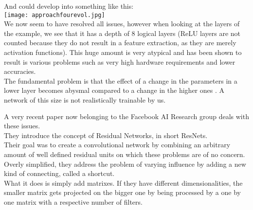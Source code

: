 And could develop into something like this:\\
\texttt{[image: approachfourevol.jpg]}\\

We now seem to have resolved all issues, however when looking at the layers of the example, we see that it has a depth of 8 logical layers (ReLU layers are not counted because they do not result in a feature extraction, as they are merely activation functions). This huge amount is very atypical and has been shown to result is various problems such as very high hardware requirements and lower accuracies\cite{Simonyan2015}.\\
The fundamental problem is that the effect of a change in the parameters in a lower layer becomes abysmal compared to a change in the higher ones \cite{Simonyan2015} \cite{Hochreiter1991}.
A network of this size is not realistically trainable by us. 

A very recent paper now belonging to the Facebook AI Research group deals with these issues.\\
They introduce the concept of Residual Networks, in short ResNets. \cite{KaimingHe2015}\\
Their goal was to create a convolutional network by combining an arbitrary amount of well defined residual units on which these problems are of no concern.
Overly simplified, they address the problem of varying influence by adding a new kind of connecting, called a shortcut.\\

What it does is simply add matrixes. If they have different dimensionalities, the smaller matrix gets projected on the bigger one by being processed by a one by one matrix with a respective number of filters.\\

